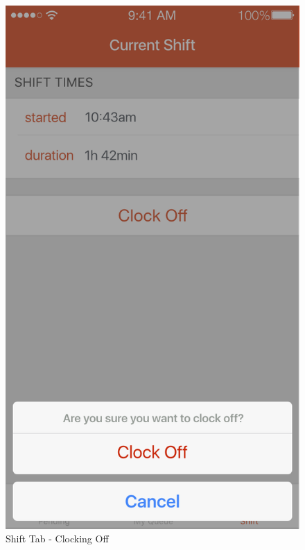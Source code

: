 \documentclass[a4paper,12pt]{article}
\begin{document}
\begin{figure}[p]
\centering
\includegraphics[scale=0.5]{2ac3c9eec5.png}
\caption{Shift Tab - Clocking Off}
\label{17}
\end{figure}
\end{document}
